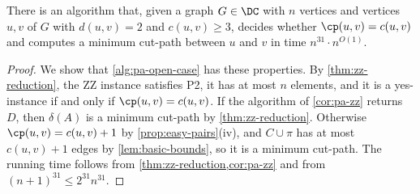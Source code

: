 \begin{theorem}
\label{thm:pa-open-case}
There is an algorithm that, given a graph $G \in \DC$ with $n$ vertices and vertices $u, v$ of $G$ with $d(u, v) = 2$ and $c(u, v) \geq 3$, decides whether $\cp(u, v) = c(u, v)$ and computes a minimum cut-path between $u$ and $v$ in time $n^{31} \cdot n^{O(1)}$.
\end{theorem}

\begin{proof}
We show that \cref{alg:pa-open-case} has these properties.
By \cref{thm:zz-reduction}, the ZZ instance satisfies P2, it has at most $n$ elements, and it is a yes-instance if and only if $\cp(u, v) = c(u, v)$.
If the algorithm of \cref{cor:pa-zz} returns $D$, then $\delta(A)$ is a minimum cut-path by \cref{thm:zz-reduction}.
Otherwise $\cp(u, v) = c(u, v) + 1$ by \cref{prop:easy-pairs}(iv), and $C \cup \pi$ has at most $c(u, v) + 1$ edges by \cref{lem:basic-bounds}, so it is a minimum cut-path.
The running time follows from \cref{thm:zz-reduction,cor:pa-zz} and from $(n + 1)^{31} \leq 2^{31} n^{31}$.
\end{proof}


